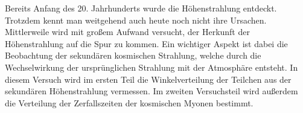 Bereits Anfang des 20. Jahrhunderts wurde die Höhenstrahlung entdeckt. Trotzdem kennt man weitgehend auch heute noch nicht ihre Ursachen. Mittlerweile wird mit großem Aufwand versucht, der Herkunft der Höhenstrahlung auf die Spur zu kommen. Ein wichtiger Aspekt ist dabei die Beobachtung der sekundären kosmischen Strahlung, welche durch die Wechselwirkung der ursprünglichen Strahlung mit der Atmosphäre entsteht. In diesem Versuch wird im ersten Teil die Winkelverteilung der Teilchen aus der sekundären Höhenstrahlung vermessen. Im zweiten Versuchsteil wird außerdem die Verteilung der Zerfallszeiten der kosmischen Myonen bestimmt.   
